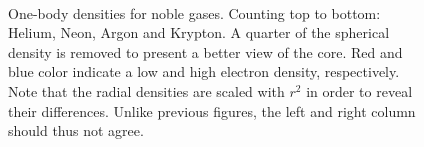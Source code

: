 \begin{figure}
\begin{center}
     \\
  \caption{One-body densities for noble gases. Counting top to bottom: Helium, Neon, Argon and Krypton. A quarter of the spherical density is removed to present a better view of the core. Red and blue color indicate a low and high electron density, respectively. Note that the radial densities are scaled with $r^2$ in order to reveal their differences. Unlike previous figures, the left and right column should thus not agree.}
  \label{fig:OBD_noble_Atoms_2D_combo}
 \end{center}
\end{figure}
 
 
